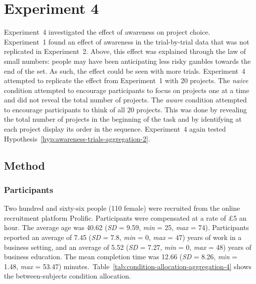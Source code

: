 \documentclass[a4paper, nobind, dvipsnames]{templates/ociamthesis}
\theoremstyle{definition}
\theoremstyle{definition}
\theoremstyle{definition}
\theoremstyle{definition}
\theoremstyle{remark}
\begin{document}
\hypertarget{aggregation-4}{%
\section{Experiment 4}\label{aggregation-4}}

Experiment~4 investigated the effect of awareness on project choice.
Experiment~1 found an effect of awareness in the trial-by-trial data that was
not replicated in Experiment~2. Above, this effect was explained through the law
of small numbers: people may have been anticipating less risky gambles towards
the end of the set. As such, the effect could be seen with more trials.
Experiment~4 attempted to replicate the effect from Experiment~1 with 20
projects. The \emph{naive} condition attempted to encourage participants to focus on
projects one at a time and did not reveal the total number of projects. The
\emph{aware} condition attempted to encourage participants to think of all 20
projects. This was done by revealing the total number of projects in the
beginning of the task and by identifying at each project display its order in
the sequence. Experiment~4 again tested
Hypothesis~\ref{hyp:awareness-trials-aggregation-2}.

\subsection{Method}

\subsubsection{Participants}

Two hundred and sixty-six people (110 female) were recruited from the online recruitment platform Prolific. Participants were compensated at a rate of £5 an hour. The average age was 40.62 (\emph{SD} = 9.59, \emph{min} = 25, \emph{max} = 74). Participants reported an average of 7.45 (\emph{SD} = 7.8, \emph{min} = 0, \emph{max} = 47) years of work in a business setting, and an average of 5.52 (\emph{SD} = 7.27, \emph{min} = 0, \emph{max} = 48) years of business education. The mean completion time was 12.66 (\emph{SD} = 8.26, \emph{min} = 1.48, \emph{max} = 53.47) minutes.~Table~\ref{tab:condition-allocation-aggregation-4}
shows the between-subjects condition allocation.
\end{document}
